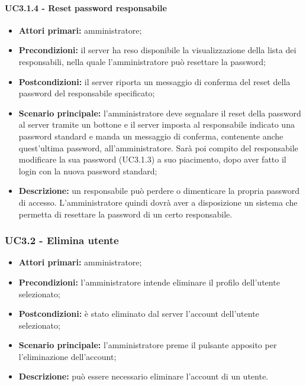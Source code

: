 \paragraph{UC3.1.4 - Reset password responsabile}

\begin{itemize}
	\item 	\textbf{Attori primari:} amministratore;
	\item 	\textbf{Precondizioni:} il server ha reso disponibile la visualizzazione della lista dei responsabili, nella quale l'amministratore può resettare la password;
	\item 	\textbf{Postcondizioni:} il server riporta un messaggio di conferma del reset della password del responsabile specificato;
	\item 	\textbf{Scenario principale:} l'amministratore deve segnalare il reset della password al server tramite un bottone e il server imposta al responsabile indicato una password standard e manda un messaggio di conferma, contenente anche quest'ultima password, all'amministratore. Sarà poi compito del responsabile modificare la sua password (UC3.1.3) a suo piacimento, dopo aver fatto il login con la nuova password standard;
	\item 	\textbf{Descrizione:} un responsabile può perdere o dimenticare la propria password di accesso. L'amministratore quindi dovrà aver a disposizione un sistema che permetta di resettare la password di un certo responsabile.

\end{itemize}

\subsubsection{UC3.2 - Elimina utente}

\begin{itemize}
	\item 	\textbf{Attori primari:} amministratore;
	\item 	\textbf{Precondizioni:} l'amministratore intende eliminare il profilo dell'utente selezionato;
	\item 	\textbf{Postcondizioni:} è stato eliminato dal server l'account dell'utente selezionato;
	\item 	\textbf{Scenario principale:} l'amministratore preme il pulsante apposito per l'eliminazione dell'account;
	\item 	\textbf{Descrizione:} può essere necessario eliminare l'account di un utente.
\end{itemize}

